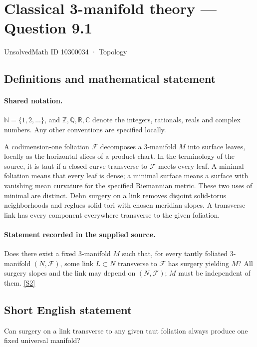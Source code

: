 \documentclass[11pt]{article}
\newcommand{\sref}[2]{\hyperlink{source:#1:#2}{[S#2]}}
\begin{document}
\setcounter{section}{10300033}
\section{Classical 3-manifold theory — Question 9.1}\label{10300034}
{\small\sffamily UnsolvedMath ID 10300034 · Topology}
\subsection{Definitions and mathematical statement}

\paragraph{Shared notation.}$\mathbb N=\{1,2,\ldots\}$, and $\mathbb Z,\mathbb Q,\mathbb R,\mathbb C$ denote the integers, rationals, reals and complex numbers. Any other conventions are specified locally.


A codimension-one foliation $\mathcal F$ decomposes a $3$-manifold $M$ into surface leaves, locally as the horizontal slices of a product chart. In the terminology of the source, it is taut if a closed curve transverse to $\mathcal F$ meets every leaf. A minimal foliation means that every leaf is dense; a minimal surface means a surface with vanishing mean curvature for the specified Riemannian metric. These two uses of minimal are distinct. Dehn surgery on a link removes disjoint solid-torus neighborhoods and reglues solid tori with chosen meridian slopes. A transverse link has every component everywhere transverse to the given foliation.
\paragraph{Statement recorded in the supplied source.}
Does there exist a fixed $3$-manifold $M$ such that, for every tautly foliated $3$-manifold $(N,\mathcal F)$, some link $L\subset N$ transverse to $\mathcal F$ has surgery yielding $M$? All surgery slopes and the link may depend on $(N,\mathcal F)$; $M$ must be independent of them. \sref{10300034}{2}
\subsection{Short English statement}
Can surgery on a link transverse to any given taut foliation always produce one fixed universal manifold?
\end{document}
